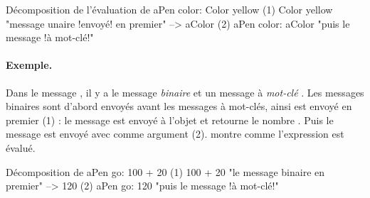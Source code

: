 \documentclass[a4paper,10pt,twoside]{book}
\begin{document}
\begin{example}[decColor]{D\'ecomposition de l'\'evaluation de }{}
        aPen color: Color yellow
(1)                       Color yellow        "message unaire !envoy\'e! en premier"
                        --> aColor
(2)   aPen color: aColor                 "puis le message !\`a mot-cl\'e!"
\end{example}

\paragraph{Exemple.} Dans le message , il y a le message \emph{binaire}  et un message \`a \emph{mot-cl\'e} . Les messages binaires sont d'abord envoy\'es avant les messages \`a mot-cl\'es, ainsi  est envoy\'e en premier (1) : le message  est envoy\'e \`a l'objet  et retourne le nombre . Puis le message  est envoy\'e avec comme argument  (2).
 montre comme l'expression est \'evalu\'e. 

\begin{example}[decGo]{D\'ecomposition de }{}
      aPen go: 100 + 20   
(1)                 100 + 20           "le message binaire en premier"
                   -->   120
(2)  aPen go: 120                   "puis le message !\`a mot-cl\'e!"
\end{example}
\end{document}
